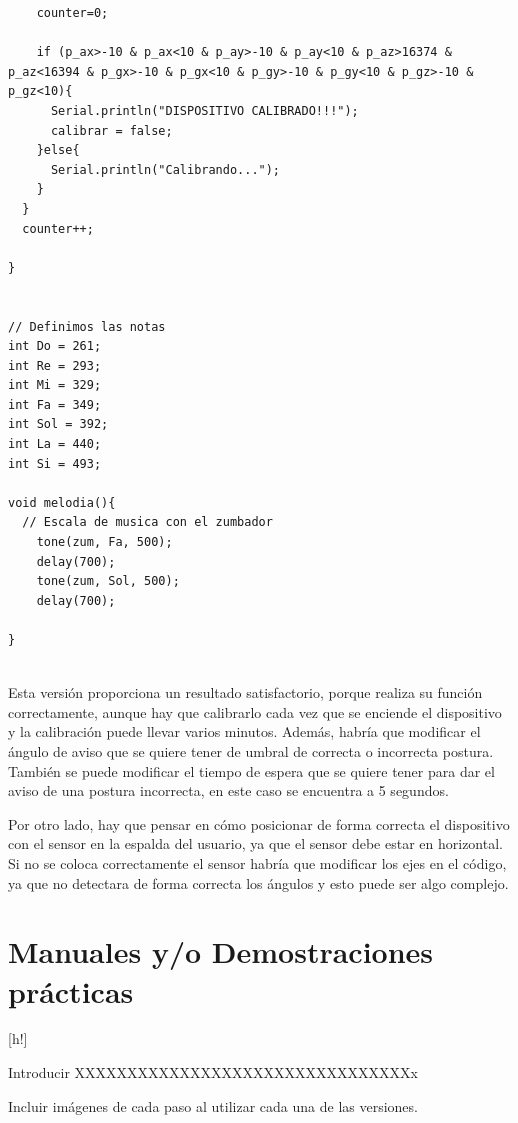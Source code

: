 \begin{lstlisting}
    counter=0; 

    if (p_ax>-10 & p_ax<10 & p_ay>-10 & p_ay<10 & p_az>16374 & p_az<16394 & p_gx>-10 & p_gx<10 & p_gy>-10 & p_gy<10 & p_gz>-10 & p_gz<10){
      Serial.println("DISPOSITIVO CALIBRADO!!!");
      calibrar = false;
    }else{
      Serial.println("Calibrando...");
    }
  } 
  counter++;

}


// Definimos las notas
int Do = 261;
int Re = 293;
int Mi = 329;
int Fa = 349;
int Sol = 392;
int La = 440;
int Si = 493;

void melodia(){
  // Escala de musica con el zumbador
    tone(zum, Fa, 500);
    delay(700);
    tone(zum, Sol, 500);
    delay(700);
    
}


\end{lstlisting}

Esta versión proporciona un resultado satisfactorio, porque realiza su función correctamente, aunque hay que calibrarlo cada vez que se enciende el dispositivo y la calibración puede llevar varios minutos. Además, habría que modificar el ángulo de aviso que se quiere tener de umbral de correcta o incorrecta postura. También se puede modificar el tiempo de espera que se quiere tener para dar el aviso de una postura incorrecta, en este caso se encuentra a 5 segundos.

Por otro lado, hay que pensar en cómo posicionar de forma correcta el dispositivo con el sensor en la espalda del usuario, ya que el sensor debe estar en horizontal. Si no se coloca correctamente el sensor habría que modificar los ejes en el código, ya que no detectara de forma correcta los ángulos y esto puede ser algo complejo.

\newpage
\section{Manuales y/o Demostraciones prácticas}[h!]

Introducir XXXXXXXXXXXXXXXXXXXXXXXXXXXXXXXXx

Incluir imágenes de cada paso al utilizar cada una de las versiones.




    
     